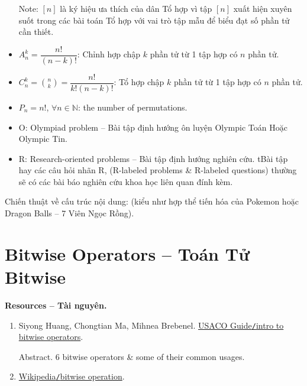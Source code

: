 \documentclass{article}
\begin{document}
\begin{itemize}
    Note: $[n]$ là ký hiệu ưa thích của dân Tổ hợp vì tập $[n]$ xuất hiện xuyên suốt trong các bài toán Tổ hợp với vai trò tập mẫu để biểu đạt số phần tử cần thiết.
    \item $A_n^k = \dfrac{n!}{(n - k)!}$: Chỉnh hợp chập $k$ phần tử từ 1 tập hợp có $n$ phần tử.
    \item $C_n^k = \binom{n}{k} = \dfrac{n!}{k!(n - k)!}$: Tổ hợp chập $k$ phần tử từ 1 tập hợp có $n$ phần tử.
    \item $P_n = n!$, $\forall n\in\mathbb{N}$: the number of permutations.
    \item O: Olympiad problem -- Bài tập định hướng ôn luyện Olympic Toán Hoặc Olympic Tin.
    \item R: Research-oriented problems -- Bài tập định hướng nghiên cứu. tBài tập hay các câu hỏi nhãn R, (R-labeled problems \& R-labeled questions) thường sẽ có các bài báo nghiên cứu khoa học liên quan đính kèm.
\end{itemize}


Chiến thuật về cấu trúc nội dung:  (kiểu như hợp thể tiến hóa của Pokemon hoặc Dragon Balls -- 7 Viên Ngọc Rồng).

\section{Bitwise Operators -- Toán Tử Bitwise}
\textbf{\textsf{Resources -- Tài nguyên.}}
\begin{enumerate}
    \item {\sc Siyong Huang, Chongtian Ma, Mihnea Brebenel}. \href{https://usaco.guide/silver/intro-bitwise}{USACO Guide{\tt/}intro to bitwise operators}.

    {\sf Abstract.} 6 bitwise operators \& some of their common usages.

    \item \href{https://en.wikipedia.org/wiki/Bitwise_operation}{Wikipedia{\tt/}bitwise operation}.
\end{enumerate}
\end{document}
